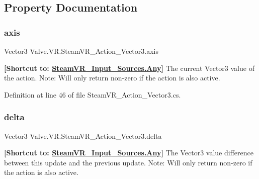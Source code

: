 \subsection{Property Documentation}
\mbox{\label{class_valve_1_1_v_r_1_1_steam_v_r___action___vector3_a915afdc4075b4df59abf6f9797eadd36}} 
\subsubsection{\texorpdfstring{axis}{axis}}
{\footnotesize\ttfamily Vector3 Valve.\+V\+R.\+Steam\+V\+R\+\_\+\+Action\+\_\+\+Vector3.\+axis\hspace{0.3cm}{\ttfamily [get]}}



{\bfseries{\mbox{[}Shortcut to\+: \mbox{\hyperlink{namespace_valve_1_1_v_r_a82e5bf501cc3aa155444ee3f0662853faed36a1ef76a59ee3f15180e0441188ad}{Steam\+V\+R\+\_\+\+Input\+\_\+\+Sources.\+Any}}\mbox{]}}} The current Vector3 value of the action. Note\+: Will only return non-\/zero if the action is also active. 



Definition at line 46 of file Steam\+V\+R\+\_\+\+Action\+\_\+\+Vector3.\+cs.

\mbox{\label{class_valve_1_1_v_r_1_1_steam_v_r___action___vector3_ac9b63c985650849f1c2ac32212ddef3e}} 
\subsubsection{\texorpdfstring{delta}{delta}}
{\footnotesize\ttfamily Vector3 Valve.\+V\+R.\+Steam\+V\+R\+\_\+\+Action\+\_\+\+Vector3.\+delta\hspace{0.3cm}{\ttfamily [get]}}



{\bfseries{\mbox{[}Shortcut to\+: \mbox{\hyperlink{namespace_valve_1_1_v_r_a82e5bf501cc3aa155444ee3f0662853faed36a1ef76a59ee3f15180e0441188ad}{Steam\+V\+R\+\_\+\+Input\+\_\+\+Sources.\+Any}}\mbox{]}}} The Vector3 value difference between this update and the previous update. Note\+: Will only return non-\/zero if the action is also active. 



